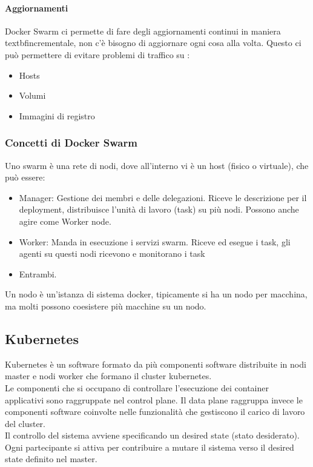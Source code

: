 \documentclass{article}
\begin{document}
		\paragraph{Aggiornamenti}
		Docker Swarm ci permette di fare degli aggiornamenti continui in maniera textbf{incrementale}, non c'è bisogno di aggiornare ogni cosa alla volta. Questo ci può permettere di evitare problemi di traffico su :
		\begin{itemize}
		    \item Hosts
		    \item Volumi
		    \item Immagini di registro
		\end{itemize}
		
		\subsubsection{Concetti di Docker Swarm}
		Uno swarm è una rete di nodi, dove all'interno vi è un host (fisico o virtuale), che può essere:
		\begin{itemize}
		    \item Manager: Gestione dei membri e delle delegazioni. Riceve le descrizione per il deployment, distribuisce l'unità di lavoro (task) su più nodi. Possono anche agire come Worker node.
		    \item Worker: Manda in esecuzione i servizi swarm. Riceve ed esegue i task, gli agenti su questi nodi ricevono e monitorano i task
		    \item Entrambi.
		\end{itemize}
		Un nodo è un'istanza di sistema docker, tipicamente si ha un nodo per macchina, ma molti possono coesistere più macchine su un nodo.
		
		\subsection{Kubernetes}
		Kubernetes è un software formato da più componenti software distribuite in nodi master e nodi worker che formano il cluster kubernetes.\\
		Le componenti che si occupano di controllare l'esecuzione dei container applicativi sono raggruppate nel control plane. Il data plane raggruppa invece le componenti software coinvolte nelle funzionalità che gestiscono il carico di lavoro del cluster.\\
		Il controllo del sistema avviene specificando un desired state (stato desiderato). Ogni partecipante si attiva per contribuire a mutare il sistema verso il desired state definito nel master.\\
		
\end{document}
